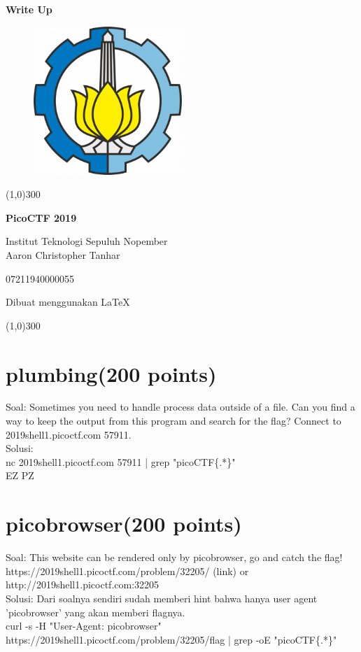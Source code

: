 \documentclass[a4paper,12pt]{article}
\title{}
\author{}
\date{}
\begin{document}
\begin{titlepage}
\begin{center}
 \textbf{Write Up}
 \vspace{1cm}
\end{center}
\begin{figure}[H]
 \centering
\includegraphics[width=0.5\textwidth]{its}\\
\end{figure}
\vspace{3cm}
\begin{center}
\line(1,0){300}

\textbf{PicoCTF 2019}


Institut Teknologi Sepuluh Nopember
\\[1cm]
Aaron Christopher Tanhar

07211940000055

Dibuat menggunakan \LaTeX\

\line(1,0){300}\\
\end{center}
\end{titlepage}
\tableofcontents
\thispagestyle{empty}
\cleardoublepage
\setcounter{page}{1}
 \section{\textbf{plumbing(200 points)}}
\vspace{1cm}
Soal:
Sometimes you need to handle process data outside of a file. Can you find a way to keep the output from this program and search for the flag? Connect to 2019shell1.picoctf.com 57911.\\
Solusi:\\
nc 2019shell1.picoctf.com 57911 | grep "picoCTF\{.*\}"\\
EZ PZ
\section{\textbf{picobrowser(200 points)}}
\vspace{1cm}
Soal: This website can be rendered only by picobrowser, go and catch the flag! \\https://2019shell1.picoctf.com/problem/32205/ (link) or http://2019shell1.picoctf.com:32205\\
Solusi: Dari soalnya sendiri sudah memberi hint bahwa hanya user agent 'picobrowser' yang akan memberi flagnya.\\
curl -s -H "User-Agent: picobrowser" https://2019shell1.picoctf.com/problem/32205/flag | grep -oE "picoCTF\{.*\}"
\\
\end{document}
